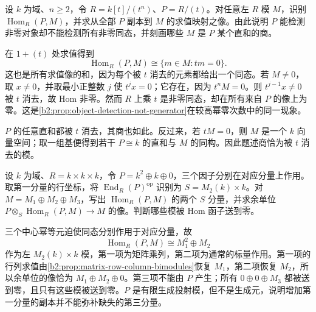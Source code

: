 \begin{exercise}\label{b2:ex:16-object-detection}
	设 \(k\) 为域、\(n\ge2\)，令 \(R=k[t]/(t^n)\)、\(P=R/(t)\)。对任意左 \(R\) 模 \(M\)，识别 \(\operatorname{Hom}_R(P,M)\)，并求从全部 \(P\) 副本到 \(M\) 的求值映射之像。由此说明 \(P\) 能检测非零对象却不能检测所有非零同态，并刻画哪些 \(M\) 是 \(P\) 某个直和的商。
\end{exercise}
\begin{solution}
	在 \(1+(t)\) 处求值得到
	\[
		\operatorname{Hom}_R(P,M)\cong\{m\in M:tm=0\}.
	\]
	这也是所有求值像的和，因为每个被 \(t\) 消去的元素都给出一个同态。若 \(M\ne0\)，取 \(x\ne0\)，并取最小正整数 \(j\) 使 \(t^jx=0\)；它存在，因为 \(t^nM=0\)。则 \(t^{j-1}x\ne0\) 被 \(t\) 消去，故 Hom 非零。然而 \(R\) 上乘 \(t\) 是非零同态，却在所有来自 \(P\) 的像上为零。这是\cref{b2:prop:object-detection-not-generator}在较高幂零次数中的同一现象。

	\(P\) 的任意直和都被 \(t\) 消去，其商也如此。反过来，若 \(tM=0\)，则 \(M\) 是一个 \(k\) 向量空间；取一组基便得到若干 \(P\cong k\) 的直和与 \(M\) 的同构。因此题述商恰为被 \(t\) 消去的模。
\end{solution}

\begin{exercise}\label{b2:ex:16-projective-not-generator}
	设 \(k\) 为域、\(R=k\times k\times k\)，令 \(P=k^2\oplus k\oplus0\)，三个因子分别在对应分量上作用。取第一分量的行坐标，将 \(\operatorname{End}_R(P)^{\mathrm{op}}\) 识别为 \(S=M_2(k)\times k\)。对 \(M=M_1\oplus M_2\oplus M_3\)，写出 \(\operatorname{Hom}_R(P,M)\) 的两个 \(S\) 分量，并求余单位 \(P\otimes_S\operatorname{Hom}_R(P,M)\to M\) 的像。判断哪些模被 Hom 函子送到零。
\end{exercise}
\begin{solution}
	三个中心幂等元迫使同态分别作用于对应分量，故
	\[
		\operatorname{Hom}_R(P,M)\cong M_1^2\oplus M_2
	\]
	作为左 \(M_2(k)\times k\) 模，第一项为矩阵乘列，第二项为通常的标量作用。第一项的行列求值由\cref{b2:prop:matrix-row-column-bimodules}恢复 \(M_1\)，第二项恢复 \(M_2\)，所以余单位的像恰为 \(M_1\oplus M_2\oplus0\)。第三项不能由 \(P\) 产生；所有 \(0\oplus0\oplus M_3\) 都被送到零，且只有这些模被送到零。\(P\) 是有限生成投射模，但不是生成元，说明增加第一分量的副本并不能弥补缺失的第三分量。
\end{solution}

